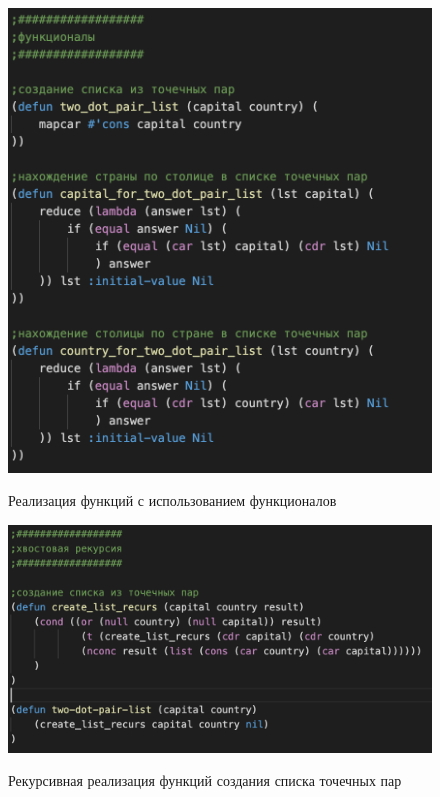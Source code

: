 \documentclass[a4paper,12pt]{article}
\begin{document}
 	\begin{figure}[h!]
 		\begin{center}
 			{\includegraphics[scale = 1.0]{5.3f.png}}
 			\label{ris:5.3f}
 		\end{center}
 	\caption{Реализация функций с использованием функционалов}
 	\end{figure}
 
 	\newpage
 
  	\begin{figure}[h!]
 	\begin{center}
 		{\includegraphics[scale = 0.8]{5.3r1.png}}
 		\label{ris:5.3r1}
 	\end{center}
 \caption{Рекурсивная реализация функций создания списка точечных пар}
 \end{figure}
\end{document}
